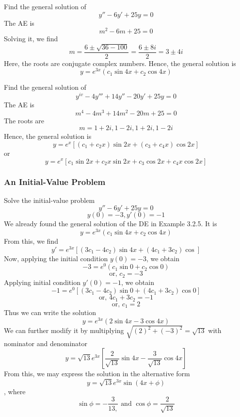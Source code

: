 \begin{example}{Find the general solution of \[
    y'' - 6y' + 25y = 0
\]}{}\vspace{-20pt}
    The AE is \[
        m^2 - 6m + 25 = 0
    \] Solving it, we find \[
        m = \frac{6 \pm \sqrt{36-100}}{2} = \frac{6\pm8i}{2} = 3 \pm 4i
    \]
    Here, the roots are conjugate complex numbers. Hence, the general solution is \[
        y = e^{3x}(c_1\sin{4x} + c_2\cos{4x})
    \]
\end{example}

\begin{example}{Find the general solution of \[
    y^{iv} - 4y''' + 14y'' - 20y' + 25y = 0
\]}{}\vspace{-20pt}
    The AE is \[
        m^4 - 4m^3 + 14m^2 - 20m + 25 = 0
    \]
    The roots are \[
        m = 1+2i, 1-2i, 1+2i, 1-2i
    \]
    Hence, the general solution is \[
        y = e^{x} [ (c_1+c_2x)\sin{2x} + (c_3+c_4x)\cos{2x} ]
    \] or \[
        y = e^{x} [ c_1\sin{2x} + c_2x\sin{2x} + c_3\cos{2x} + c_4x\cos{2x} ]
    \]
\end{example}

\vspace{20pt}
\subsubsection{An Initial-Value Problem}

\begin{example}{Solve the initial-value problem \[
    y'' - 6y' + 25y = 0
\]\[ y(0)=-3, y'(0)=-1 \]}{}
    We already found the general solution of the DE in Example 3.2.5. It is \[
        y = e^{3x}( c_1\sin{4x} + c_2\cos{4x} )
    \] From this, we find \[
        y' = e^{3x} [ (3c_1-4c_2)\sin{4x} + (4c_1+3c_2)\cos{} ]
    \] Now, applying the initial condition $y(0)=-3$, we obtain
    \[ -3 = e^{0}(c_1\sin{0} + c_2\cos{0}) \]
    \[ \text{or, } c_2=-3 \]
    Applying initial condition $y'(0)=-1$, we obtain \[
        -1 = e^{0}[ (3c_1-4c_2)\sin{0} + (4c_1+3c_2)\cos{0} ]
    \]\[ \text{or, } 4c_1 + 3c_2 = -1 \]
    \[ \text{or, } c_1=2 \]
    Thus we can write the solution \[
        y = e^{3x}(2\sin{4x} - 3\cos{4x})
    \] We can further modify it by multiplying $\sqrt{(2)^2 + (-3)^2} = \sqrt{13}$ with nominator and denominator
    \[ y = \sqrt{13}e^{3x} \left[ \frac{2}{\sqrt{13}}\sin{4x} - \frac{3}{\sqrt{13}}\cos{4x} \right] \]
    From this, we may express the solution in the alternative form \[
        y = \sqrt{13}e^{3x}\sin( 4x + \phi )
    \], where \[
        \sin{\phi}=-\frac{3}{13,} \text{ and } \cos{\phi}=\frac{2}{\sqrt{13}}
    \]
\end{example}


